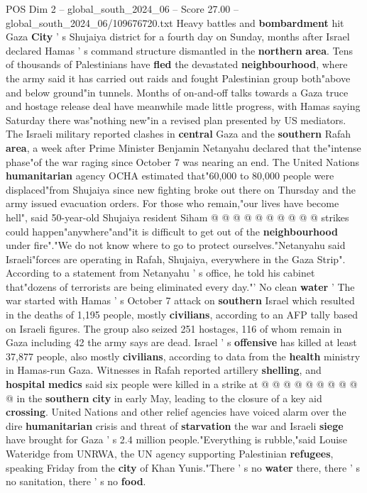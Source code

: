 \begin{textsample}{POS Dim 2 – global\_south\_2024\_06 – Score 27.00 – global\_south\_2024\_06/109676720.txt}  \label{ex:f2_pos_055}
Heavy battles and \textbf{bombardment} hit Gaza \textbf{City} ' s Shujaiya district for a fourth day on Sunday, months after Israel declared Hamas ' s command structure dismantled in the \textbf{northern} \textbf{area}.
Tens of thousands of Palestinians have \textbf{fled} the devastated \textbf{neighbourhood}, where the army said it has carried out raids and fought Palestinian group both"above and below ground"in tunnels.
Months of on-and-off talks towards a Gaza truce and hostage release deal have meanwhile made little progress, with Hamas saying Saturday there was"nothing new"in a revised plan presented by US mediators.
The Israeli military reported clashes in \textbf{central} Gaza and the \textbf{southern} Rafah \textbf{area}, a week after Prime Minister Benjamin Netanyahu declared that the"intense phase"of the war raging since October 7 was nearing an end.
The United Nations \textbf{humanitarian} agency OCHA estimated that"60,000 to 80,000 people were displaced"from Shujaiya since new fighting broke out there on Thursday and the army issued evacuation orders.
For those who remain,"our lives have become hell", said 50-year-old Shujaiya resident Siham @ @ @ @ @ @ @ @ @ @ strikes could happen"anywhere"and"it is difficult to get out of the \textbf{neighbourhood} under fire"."We do not know where to go to protect ourselves."Netanyahu said Israeli"forces are operating in Rafah, Shujaiya, everywhere in the Gaza Strip".
According to a statement from Netanyahu ' s office, he told his cabinet that"dozens of terrorists are being eliminated every day."' No clean \textbf{water} ' The war started with Hamas ' s October 7 attack on \textbf{southern} Israel which resulted in the deaths of 1,195 people, mostly \textbf{civilians}, according to an AFP tally based on Israeli figures.
The group also seized 251 hostages, 116 of whom remain in Gaza including 42 the army says are dead.
Israel ' s \textbf{offensive} has killed at least 37,877 people, also mostly \textbf{civilians}, according to data from the \textbf{health} ministry in Hamas-run Gaza.
Witnesses in Rafah reported artillery \textbf{shelling}, and \textbf{hospital} \textbf{medics} said six people were killed in a strike at @ @ @ @ @ @ @ @ @ @ in the \textbf{southern} \textbf{city} in early May, leading to the closure of a key aid \textbf{crossing}.
United Nations and other relief agencies have voiced alarm over the dire \textbf{humanitarian} crisis and threat of \textbf{starvation} the war and Israeli \textbf{siege} have brought for Gaza ' s 2.4 million people."Everything is rubble,"said Louise Wateridge from UNRWA, the UN agency supporting Palestinian \textbf{refugees}, speaking Friday from the \textbf{city} of Khan Yunis."There ' s no \textbf{water} there, there ' s no sanitation, there ' s no \textbf{food}.

\end{textsample}
